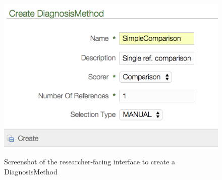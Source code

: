 %		
%		
%		
%
%			
%			
%			
%			
%
%
%
%			
%			
%
%		
%		
	
	\begin{figure}
		\centering
		\includegraphics[width=.8\textwidth]{img/screenshots/createDiagnosisMethod}
		\label{fig:diag:creatediagnosismethod}
		\caption[Creating a DiagnosisMethod]{Screenshot of the researcher-facing interface to create a DiagnosisMethod}
	\end{figure}
	

